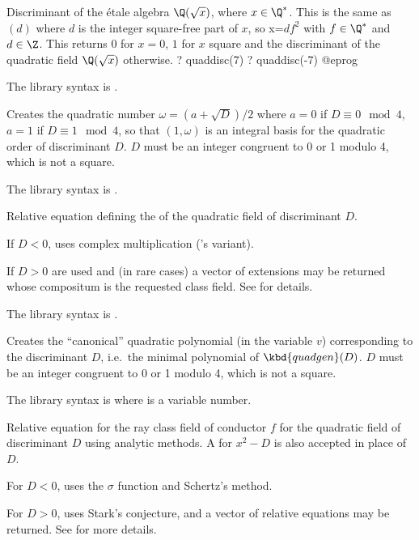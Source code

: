 \label{se:quaddisc}
Discriminant of the \'etale algebra $\Q(\sqrt{x})$, where $x\in\Q^*$.
This is the same as $(d)$ where $d$ is the integer square-free
part of $x$, so x=$d f^2$ with $f\in \Q^*$ and $d\in\Z$.
This returns $0$ for $x = 0$, $1$ for $x$ square and the discriminant of the
quadratic field $\Q(\sqrt{x})$ otherwise.
\bprog
? quaddisc(7)
? quaddisc(-7)
@eprog

The library syntax is .

\label{se:quadgen}
Creates the quadratic
number $\omega=(a+\sqrt{D})/2$ where $a=0$ if $D\equiv0\mod4$,
$a=1$ if $D\equiv1\mod4$, so that $(1,\omega)$ is an integral basis for the
quadratic order of discriminant $D$. $D$ must be an integer congruent to 0 or
1 modulo 4, which is not a square.

The library syntax is .

\label{se:quadhilbert}
Relative equation defining the
 of the quadratic field of discriminant $D$.

If $D < 0$, uses complex multiplication ('s variant).

If $D > 0$  are used and (in rare cases) a
vector of extensions may be returned whose compositum is the requested class
field. See  for details.

The library syntax is .

\label{se:quadpoly}
Creates the ``canonical'' quadratic
polynomial (in the variable $v$) corresponding to the discriminant $D$,
i.e.~the minimal polynomial of $\kbd{quadgen}(D)$. $D$ must be an integer
congruent to 0 or 1 modulo 4, which is not a square.

The library syntax is  where  is a variable number.

\label{se:quadray}
Relative equation for the ray
class field of conductor $f$ for the quadratic field of discriminant $D$
using analytic methods. A  for $x^2 - D$ is also accepted in place
of $D$.

For $D < 0$, uses the $\sigma$ function and Schertz's method.

For $D>0$, uses Stark's conjecture, and a vector of relative equations may be
returned. See  for more details.

